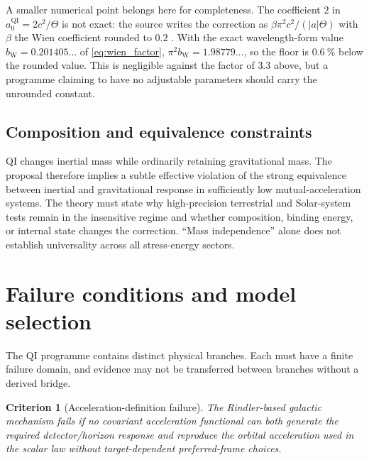 \documentclass[11pt]{article}
\newtheorem{criterion}{Criterion}
\newcommand{\QI}{\mathrm{QI}}
\begin{document}
A smaller numerical point belongs here for completeness. The coefficient \(2\) in \(a_{0}^{\QI}=2c^{2}/\Theta\) is not exact: the source writes the correction as \(\beta\pi^{2}c^{2}/(|a|\Theta)\) with \(\beta\) the Wien coefficient rounded to \(0.2\) \cite{McCulloch2012}. With the exact wavelength-form value \(b_{\mathrm W}=0.201405\ldots\) of \cref{eq:wien_factor}, \(\pi^{2}b_{\mathrm W}=1.98779\ldots\), so the floor is \(\SI{0.6}{\percent}\) below the rounded value. This is negligible against the factor of \(3.3\) above, but a programme claiming to have no adjustable parameters should carry the unrounded constant.

\subsection{Composition and equivalence constraints}

QI changes inertial mass while ordinarily retaining gravitational mass. The proposal therefore implies a subtle effective violation of the strong equivalence between inertial and gravitational response in sufficiently low mutual-acceleration systems. The theory must state why high-precision terrestrial and Solar-system tests remain in the insensitive regime and whether composition, binding energy, or internal state changes the correction. ``Mass independence'' alone does not establish universality across all stress-energy sectors.

\section{Failure conditions and model selection}
\label{sec:failure}

The QI programme contains distinct physical branches. Each must have a finite failure domain, and evidence may not be transferred between branches without a derived bridge.

\begin{criterion}[Acceleration-definition failure]
The Rindler-based galactic mechanism fails if no covariant acceleration functional can both generate the required detector/horizon response and reproduce the orbital acceleration used in the scalar law without target-dependent preferred-frame choices.
\end{criterion}
\end{document}
